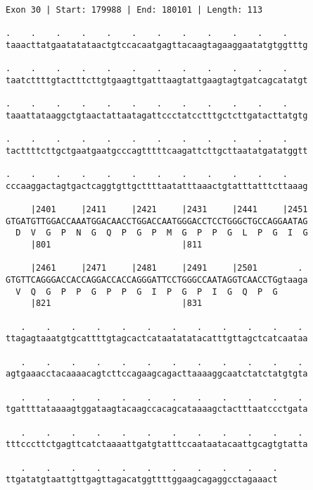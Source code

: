 \documentclass{article}
\begin{document}
\newpage
\begin{Verbatim}
Exon 30 | Start: 179988 | End: 180101 | Length: 113
 
.    .    .    .    .    .    .    .    .    .    .    .    
taaacttatgaatatataactgtccacaatgagttacaagtagaaggaatatgtggtttg
  
.    .    .    .    .    .    .    .    .    .    .    .    
taatcttttgtactttcttgtgaagttgatttaagtattgaagtagtgatcagcatatgt
  
.    .    .    .    .    .    .    .    .    .    .    .    
taaattataaggctgtaactattaatagattccctatcctttgctcttgatacttatgtg
  
.    .    .    .    .    .    .    .    .    .    .    .    
tacttttcttgctgaatgaatgcccagtttttcaagattcttgcttaatatgatatggtt
  
.    .    .    .    .    .    .    .    .    .    .    .    
cccaaggactagtgactcaggtgttgcttttaatatttaaactgtatttatttcttaaag
  
     |2401     |2411     |2421     |2431     |2441     |2451
GTGATGTTGGACCAAATGGACAACCTGGACCAATGGGACCTCCTGGGCTGCCAGGAATAG
  D  V  G  P  N  G  Q  P  G  P  M  G  P  P  G  L  P  G  I  G
     |801                          |811                     
  
     |2461     |2471     |2481     |2491     |2501        . 
GTGTTCAGGGACCACCAGGACCACCAGGGATTCCTGGGCCAATAGGTCAACCTGgtaaga
  V  Q  G  P  P  G  P  P  G  I  P  G  P  I  G  Q  P  G      
     |821                          |831                     
  
   .    .    .    .    .    .    .    .    .    .    .    . 
ttagagtaaatgtgcattttgtagcactcataatatatacatttgttagctcatcaataa
  
   .    .    .    .    .    .    .    .    .    .    .    . 
agtgaaacctacaaaacagtcttccagaagcagacttaaaaggcaatctatctatgtgta
  
   .    .    .    .    .    .    .    .    .    .    .    . 
tgattttataaaagtggataagtacaagccacagcataaaagctactttaatccctgata
  
   .    .    .    .    .    .    .    .    .    .    .    . 
tttcccttctgagttcatctaaaattgatgtatttccaataatacaattgcagtgtatta
  
   .    .    .    .    .    .    .    .    .    .    .
ttgatatgtaattgttgagttagacatggttttggaagcagaggcctagaaact
\end{Verbatim}
\newpage
\end{document}
